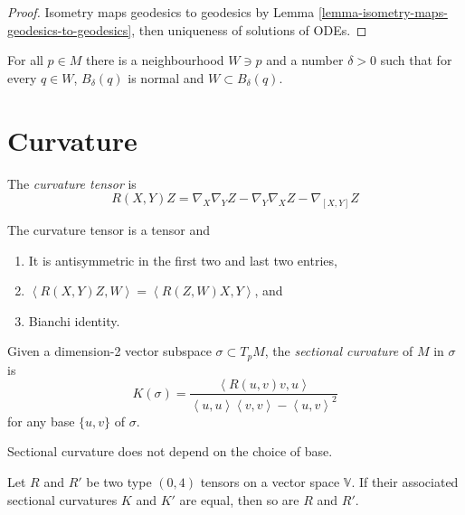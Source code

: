 \begin{proof}
Isometry maps geodesics to geodesics by Lemma 
\ref{lemma-isometry-maps-geodesics-to-geodesics}, then uniqueness of solutions
of ODEs.
\end{proof}

\begin{proposition}
\label{proposition-totally-normal-neighbourhoods}
For all $p \in M$ there is a neighbourhood $W \ni p$ and a number $\delta>0$ 
 such that for every $q \in W$, $B_\delta(q)$ is normal and
 $W \subset B_\delta(q)$. 
\end{proposition}

\section{Curvature}
\label{section-curvature}

The {\it curvature tensor} is
\begin{equation}
\label{equation-curvature-tensor}
R(X,Y)Z=\nabla_X\nabla_YZ-\nabla_Y\nabla_XZ-\nabla_{[X,Y]}Z
\end{equation}

\begin{proposition}
\label{proposition-symmetries-of-curvature-tensor}
The curvature tensor is a tensor and
\begin{enumerate}
\item It is antisymmetric in the first two and last two entries,
\item $\left<R(X,Y)Z,W\right>=\left<R(Z,W)X,Y\right>$, and
\item Bianchi identity.
\end{enumerate}
\end{proposition}

Given a dimension-2 vector subspace $\sigma\subset T_pM$, the {\it sectional
curvature} of $M$ in $\sigma$ is
\begin{equation}
\label{equation-sectional-curvature}
K(\sigma)=\frac{\left<R(u,v)v,u\right>}
{\left<u,u\right>\left<v,v\right>-\left<u,v\right>^2}
\end{equation}
for any base $\{u,v\}$ of $\sigma$.

\begin{lemma}
\label{lemma-sectional-curvature-is-well-defined}
Sectional curvature does not depend on the choice of base.
\end{lemma}

\begin{proposition}
\label{proposition-curvature-like-tensor-determined-by-sectional-curvature}
Let $R$ and $R'$ be two type $(0,4)$ tensors on a vector space $\mathbb{V}$. If
their associated sectional curvatures $K$ and $K'$ are equal, then so are $R$
and $R'$.
\end{proposition}

